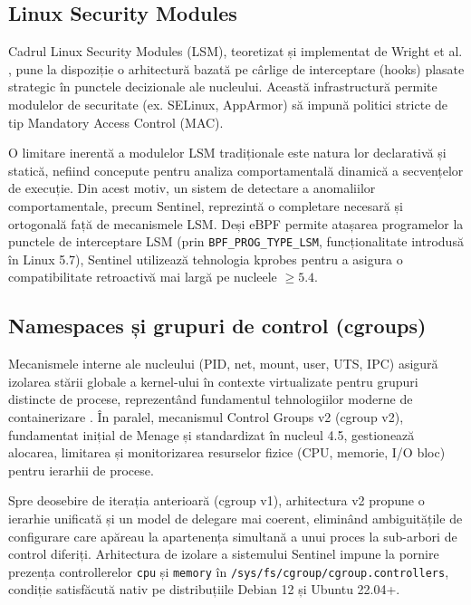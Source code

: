 \subsection{Linux Security Modules}
\label{subsec:lsm}

\par Cadrul Linux Security Modules (LSM), teoretizat și implementat de Wright et al. \cite{Wright2002}, pune la dispoziție o arhitectură bazată pe cârlige de interceptare (hooks) plasate strategic în punctele decizionale ale nucleului. Această infrastructură permite modulelor de securitate (ex. SELinux, AppArmor) să impună politici stricte de tip Mandatory Access Control (MAC).

\par O limitare inerentă a modulelor LSM tradiționale este natura lor declarativă și statică, nefiind concepute pentru analiza comportamentală dinamică a secvențelor de execuție. Din acest motiv, un sistem de detectare a anomaliilor comportamentale, precum Sentinel, reprezintă o completare necesară și ortogonală față de mecanismele LSM. Deși eBPF permite atașarea programelor la punctele de interceptare LSM (prin \texttt{BPF\_PROG\_TYPE\_LSM}, funcționalitate introdusă în Linux 5.7), Sentinel utilizează tehnologia kprobes pentru a asigura o compatibilitate retroactivă mai largă pe nucleele $\geq 5.4$.


\subsection{Namespaces și grupuri de control (cgroups)}
\label{subsec:cgroups}

\par Mecanismele interne ale nucleului (PID, net, mount, user, UTS, IPC) asigură izolarea stării globale a kernel-ului în contexte virtualizate pentru grupuri distincte de procese, reprezentând fundamentul tehnologiilor moderne de containerizare \cite{Kerrisk2010}. În paralel, mecanismul Control Groups v2 (cgroup v2), fundamentat inițial de Menage \cite{Menage2007} și standardizat în nucleul 4.5, gestionează alocarea, limitarea și monitorizarea resurselor fizice (CPU, memorie, I/O bloc) pentru ierarhii de procese.

\par Spre deosebire de iterația anterioară (cgroup v1), arhitectura v2 propune o ierarhie unificată și un model de delegare mai coerent, eliminând ambiguitățile de configurare care apăreau la apartenența simultană a unui proces la sub-arbori de control diferiți. Arhitectura de izolare a sistemului Sentinel impune la pornire prezența controllerelor \texttt{cpu} și \texttt{memory} în \texttt{/sys/fs/cgroup/cgroup.controllers}, condiție satisfăcută nativ pe distribuțiile Debian 12 și Ubuntu 22.04+.



